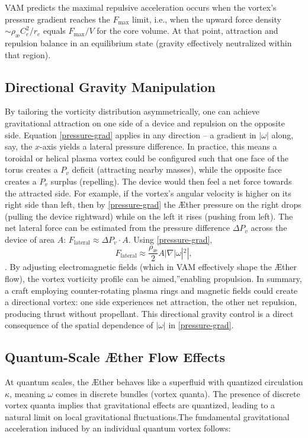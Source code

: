 \documentclass[a4paper,12pt]{article}
\begin{document}
VAM predicts the maximal repulsive acceleration occurs when the vortex's pressure gradient reaches the $F_{\max}$ limit, i.e., when the upward force density $\sim \rho_\text{\ae} C_e^2/r_e$ equals $F_{\max}/V$ for the core volume. At that point, attraction and repulsion balance in an equilibrium state (gravity effectively neutralized within that region).

\subsection*{Directional Gravity Manipulation}
By tailoring the vorticity distribution asymmetrically, one can achieve gravitational attraction on one side of a device and repulsion on the opposite side. Equation \eqref{pressure-grad} applies in any direction – a gradient in $|\omega|$ along, say, the $x$-axis yields a lateral pressure difference. In practice, this means a toroidal or helical plasma vortex could be configured such that one face of the torus creates a $P_v$ deficit (attracting nearby masses), while the opposite face creates a $P_v$ surplus (repelling). The device would then feel a net force towards the attracted side. For example, if the vortex's angular velocity is higher on its right side than left, then by \eqref{pressure-grad} the Æther pressure on the right drops (pulling the device rightward) while on the left it rises (pushing from left). The net lateral force can be estimated from the pressure difference $\Delta P_v$ across the device of area $A$: $F_{\text{lateral}}\approx \Delta P_v \cdot A$. Using \eqref{pressure-grad},
\begin{equation}
    F_\text{lateral} \approx \frac{\rho_\text{\ae}}{2} A |\nabla |\omega|^2|,
    \label{eq:lateral_force}
\end{equation}
. By adjusting electromagnetic fields (which in VAM effectively shape the Æther flow), the vortex vorticity profile can be \grqq aimed,\textquotedblright enabling propulsion. In summary, a craft employing counter-rotating plasma rings and magnetic fields could create a directional vortex: one side experiences net attraction, the other net repulsion, producing thrust without propellant. This directional gravity control is a direct consequence of the spatial dependence of $|\omega|$ in \eqref{pressure-grad}.

\subsection*{Quantum-Scale Æther Flow Effects}
At quantum scales, the Æther behaves like a superfluid with quantized circulation $\kappa$, meaning $\omega$ comes in discrete bundles (vortex quanta). The presence of discrete vortex quanta implies that gravitational effects are quantized, leading to a natural limit on local gravitational fluctuations.The fundamental gravitational acceleration induced by an individual quantum vortex follows:
\end{document}
